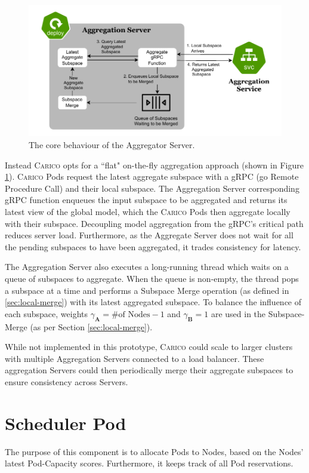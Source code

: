 \begin{figure}[ht!]
    \centering
    \includegraphics[width=\textwidth]{images/carico-agg.pdf}
    \caption{The core behaviour of the Aggregator Server.}
    \label{fig:spazio-agg-components}
\end{figure}

Instead \textsc{Carico} opts for a ``flat" on-the-fly aggregation approach
(shown in Figure \ref{fig:spazio-agg-components}).
\textsc{Carico} Pods request the latest aggregate subspace with a gRPC (go
Remote Procedure Call) and their local subspace. The Aggregation Server
corresponding gRPC function enqueues the input subspace to be aggregated and
returns its latest view of the global model, which the \textsc{Carico} Pods then
aggregate locally with their subspace. Decoupling model aggregation from the
gRPC's critical path reduces server load. Furthermore, as the Aggregate
Server does not wait for all the pending subspaces to have been aggregated, it
trades consistency for latency.

The Aggregation Server also executes a long-running thread which waits on a
queue of subspaces to aggregate. When the queue is non-empty, the thread pops
a subspace at a time and performs a Subspace Merge operation (as defined in
\ref{sec:local-merge}) with its latest aggregated subspace. To balance the
influence of each subspace, weights $\gamma_{\mathbf{A}} = \text{\# of Nodes}
- 1$ and $\gamma_{\mathbf{B}} = 1$ are used in the Subspace-Merge (as per
Section \ref{sec:local-merge}).

While not implemented in this prototype, \textsc{Carico} could scale to larger
clusters with  multiple Aggregation Servers connected to a load balancer. These
aggregation Servers could then periodically merge their aggregate subspaces to
ensure consistency across Servers.

\section{Scheduler Pod}
The purpose of this component is to allocate Pods to Nodes, based on the Nodes'
latest Pod-Capacity scores. Furthermore, it keeps track of all Pod reservations.

